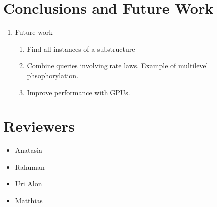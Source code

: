 \documentclass{article}
\begin{document}
\section{Conclusions and Future Work}
\begin{enumerate}
    \item Future work
    \begin{enumerate}
        \item Find all instances of a substructure
        \item Combine queries involving rate laws. Example of multilevel phsophorylation.
        \item Improve performance with GPUs.
    \end{enumerate}
\end{enumerate}

\section{Reviewers}
\begin{itemize}
    \item Anatasia
    \item Rahuman
    \item Uri Alon
    \item Matthias
\end{itemize}



\end{document}
